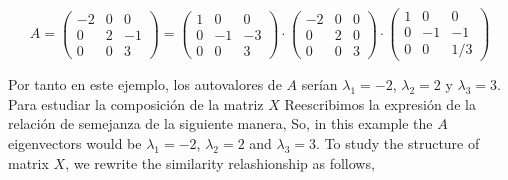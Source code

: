 \begin{equation*}
A= \begin{pmatrix}
-2& 0& 0\\
0& 2 & -1\\
0& 0& 3
\end{pmatrix}=\begin{pmatrix}
1& 0& 0\\
0& -1& -3\\
0& 0& 3
\end{pmatrix}\cdot \begin{pmatrix}
-2& 0& 0\\
0& 2& 0\\
0& 0& 3
\end{pmatrix} \cdot \begin{pmatrix}
1& 0& 0\\
0& -1& -1\\
0& 0& 1/3
\end{pmatrix}
\end{equation*}
\begin{paracol}{2}
Por tanto en este ejemplo, los autovalores de $A$ serían $\lambda_1=-2$, $\lambda_2=2$ y $\lambda_3=3$. Para estudiar la composición de la matriz $X$ Reescribimos la expresión de la relación de semejanza de la siguiente manera,
\switchcolumn
So, in this example the $A$ eigenvectors would be $\lambda_1=-2$, $\lambda_2=2$ and $\lambda_3=3$. To study the structure of matrix $X$, we rewrite the similarity relashionship as follows,
\end{paracol}

